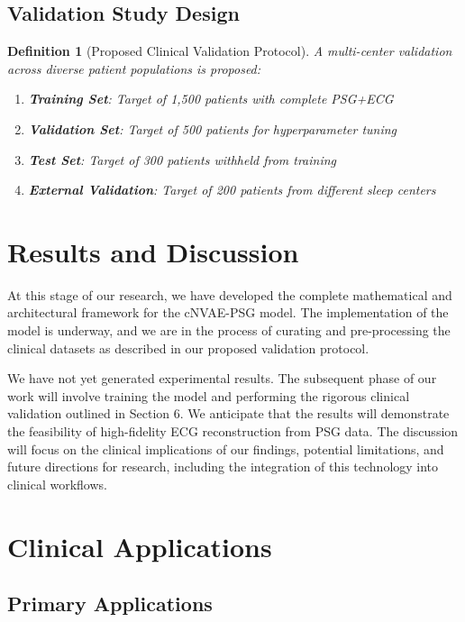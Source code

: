 \documentclass[11pt,en]{elegantpaper}
\newtheorem{definition}{Definition}
\begin{document}
\subsection{Validation Study Design}

\begin{definition}[Proposed Clinical Validation Protocol]
A multi-center validation across diverse patient populations is proposed:
\begin{enumerate}
\item \textbf{Training Set}: Target of 1,500 patients with complete PSG+ECG
\item \textbf{Validation Set}: Target of 500 patients for hyperparameter tuning
\item \textbf{Test Set}: Target of 300 patients withheld from training
\item \textbf{External Validation}: Target of 200 patients from different sleep centers
\end{enumerate}
\end{definition}

\section{Results and Discussion}

At this stage of our research, we have developed the complete mathematical and architectural framework for the cNVAE-PSG model. The implementation of the model is underway, and we are in the process of curating and pre-processing the clinical datasets as described in our proposed validation protocol.

We have not yet generated experimental results. The subsequent phase of our work will involve training the model and performing the rigorous clinical validation outlined in Section 6. We anticipate that the results will demonstrate the feasibility of high-fidelity ECG reconstruction from PSG data. The discussion will focus on the clinical implications of our findings, potential limitations, and future directions for research, including the integration of this technology into clinical workflows.

\section{Clinical Applications}

\subsection{Primary Applications}
\end{document}
